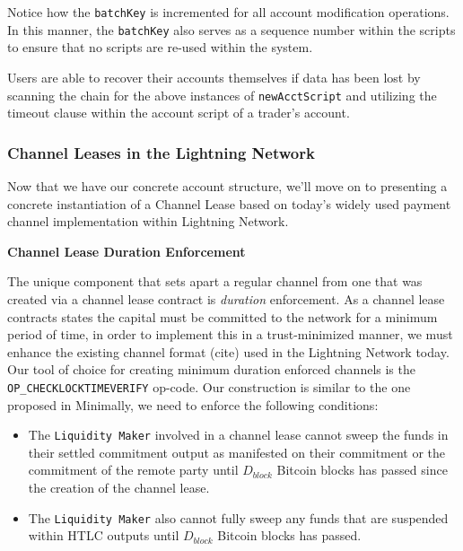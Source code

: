 \documentclass[10pt,a4paper]{article}
\theoremstyle{definition}
\begin{document}
Notice how the \texttt{batchKey} is incremented for all account modification
operations. In this manner, the \texttt{batchKey} also serves as a sequence
number within the scripts to ensure that no scripts are re-used within the
system.

Users are able to recover their accounts themselves if data has been lost by
scanning the chain for the above instances of \texttt{newAcctScript} and
utilizing the timeout clause within the account script of a trader's account.


\subsubsection{Channel Leases in the Lightning Network}

Now that we have our concrete account structure, we'll move on to presenting a
concrete instantiation of a Channel Lease based on today's widely used payment
channel implementation within Lightning Network. \\

\begin{center}
    \textbf{Channel Lease Duration Enforcement}
\end{center}

The unique component that sets apart a regular channel from one that was
created via a channel lease contract is \emph{duration} enforcement. As a
channel lease contracts states the capital must be committed to the network for
a minimum period of time, in order to implement this in a trust-minimized
manner, we must enhance the existing channel format (cite) used in the
Lightning Network today. Our tool of choice for creating minimum duration
enforced channels is the \texttt{OP\_CHECKLOCKTIMEVERIFY} \cite{cltvBip}
op-code. Our construction is similar to the one proposed in \cite{zTowards}
Minimally, we need to enforce the following conditions:
\begin{itemize}
    \item The \texttt{Liquidity Maker} involved in a channel lease cannot sweep
        the funds in their settled commitment output as manifested on their
        commitment or the commitment of the remote party until $D_{block}$
        Bitcoin blocks has passed since the creation of the channel lease.
    \item The \texttt{Liquidity Maker} also cannot fully sweep any funds that
        are suspended within HTLC outputs until $D_{block}$ Bitcoin blocks has
        passed.
\end{itemize}
\end{document}
